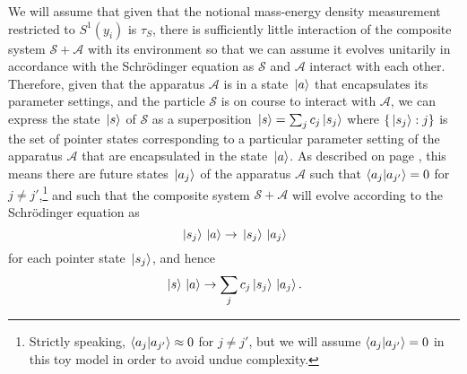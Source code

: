 We will assume that given that the notional mass-energy density measurement restricted to $S^1(y_i)$ is $\tau_S$, there is sufficiently little interaction of the composite system $\mathcal{S}+\mathcal{A}$ with its environment so that we can assume it evolves unitarily in accordance with the Schr\"{o}dinger equation as $\mathcal{S}$ and $\mathcal{A}$ interact with each other. Therefore, given that the apparatus $\mathcal{A}$ is in a state $\ket*{a}$ that encapsulates its parameter settings, and the particle $\mathcal{S}$ is on course to interact with $\mathcal{A}$, we can express the state $\ket*{s}$ of $\mathcal{S}$ as a superposition $\ket*{s}=\sum_j c_j \ket*{s_j}$ where $\{\ket*{s_j}:j\}$ %
%
 is the set of pointer states corresponding to a particular parameter setting of the apparatus $\mathcal{A}$ that are encapsulated in the state $\ket*{a}$. As described on page \pageref{pointer}, this means there are future states $\ket*{a_j}$  %
%
of the apparatus $\mathcal{A}$ such that $\ip{a_j}{a_{j'}}=0$ for $j\neq j'$,\footnote{Strictly speaking, $\ip{a_j}{a_{j'}}\approx 0$ for $j\neq j'$, but we will assume $\ip{a_j}{a_{j'}}=0$ in this toy model in order to avoid undue complexity.} and such that the composite system $\mathcal{S}+\mathcal{A}$ will evolve according to the Schr\"{o}dinger equation as
\begin{equation*}
\ket*{s_j}\ket*{a}\rightarrow \ket*{s_j}\ket*{a_j} 
\end{equation*}
for each pointer state $\ket*{s_j}$, and hence
\begin{equation}\label{saevolution}
\ket*{s}\ket*{a}\rightarrow \sum_j c_j \ket*{s_j}\ket*{a_j}.
\end{equation}

